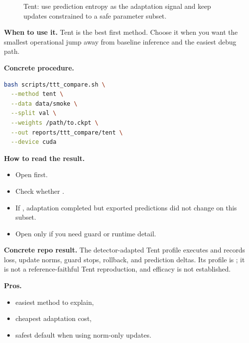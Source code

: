\begin{figure}[h]
\centering
{}
\caption{Tent: use prediction entropy as the adaptation signal and keep updates constrained to a safe parameter subset.}
\end{figure}

\textbf{When to use it.}
Tent is the best first method. Choose it when you want the smallest operational jump away from baseline inference and the easiest debug path.

\textbf{Concrete procedure.}
\begin{lstlisting}[language=bash]
bash scripts/ttt_compare.sh \
  --method tent \
  --data data/smoke \
  --split val \
  --weights /path/to.ckpt \
  --out reports/ttt_compare/tent \
  --device cuda
\end{lstlisting}

\textbf{How to read the result.}
\begin{itemize}
  \item Open  first.
  \item Check whether .
  \item If , adaptation completed but exported predictions did not change on this subset.
  \item Open  only if you need guard or runtime detail.
\end{itemize}

\textbf{Concrete repo result.}
The detector-adapted Tent profile executes and records loss, update norms,
guard stops, rollback, and prediction deltas. Its profile is
\cmd{yolozu\_detector\_entropy\_v2}; it is not a reference-faithful Tent
reproduction, and efficacy is not established.

\textbf{Pros.}
\begin{itemize}
  \item easiest method to explain,
  \item cheapest adaptation cost,
  \item safest default when using norm-only updates.
\end{itemize}

